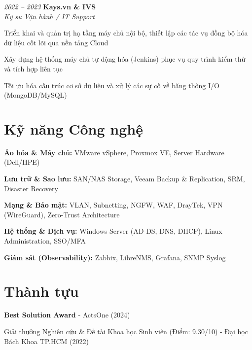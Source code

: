 \begin{twocolentry}{\textit{2022 -- 2023}}
    \textbf{Kays.vn \& IVS} \\[4pt]
    \textit{Kỹ sư Vận hành / IT Support}
\end{twocolentry}
\begin{onecolentry}
    \begin{highlights}
        \item Triển khai và quản trị hạ tầng máy chủ nội bộ, thiết lập các tác vụ đồng bộ hóa dữ liệu cốt lõi qua nền tảng Cloud
        \item Xây dựng hệ thống máy chủ tự động hóa (Jenkins) phục vụ quy trình kiểm thử và tích hợp liên tục
        \item Tối ưu hóa cấu trúc cơ sở dữ liệu và xử lý các sự cố về băng thông I/O (MongoDB/MySQL)
    \end{highlights}
\end{onecolentry}

\section{Kỹ năng Công nghệ}
\begin{onecolentry}
\begin{highlights}
    \item \textbf{Ảo hóa \& Máy chủ:} VMware vSphere, Proxmox VE, Server Hardware (Dell/HPE)
    \item \textbf{Lưu trữ \& Sao lưu:} SAN/NAS Storage, Veeam Backup \& Replication, SRM, Disaster Recovery
    \item \textbf{Mạng \& Bảo mật:} VLAN, Subnetting, NGFW, WAF, DrayTek, VPN (WireGuard), Zero-Trust Architecture
    \item \textbf{Hệ thống \& Dịch vụ:} Windows Server (AD DS, DNS, DHCP), Linux Administration, SSO/MFA
    \item \textbf{Giám sát (Observability):} Zabbix, LibreNMS, Grafana, SNMP Syslog
\end{highlights}
\end{onecolentry}

\section{Thành tựu}
\begin{onecolentry}
    \begin{highlights}
        \item \textbf{Best Solution Award} - ActsOne (2024)
        \item Giải thưởng Nghiên cứu \& Đề tài Khoa học Sinh viên (Điểm: 9.30/10) - Đại học Bách Khoa TP.HCM (2022)
    \end{highlights}
\end{onecolentry}
